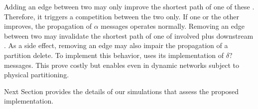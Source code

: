 Adding an edge between two \processes may only improve the shortest
path of one of these \processes. Therefore, it triggers a competition
between the two \processes only. If one or the other \process
improves, the propagation of $\alpha$ messages operates normally.
Removing an edge between two \processes may invalidate the
shortest path of one of involved \processes plus downstream
\processes. As a side effect, removing an edge may also impair the
propagation of a partition delete. To implement this behavior, \NAME
uses its implementation of $\delta?$ messages. This prove costly but
enables \NAME even in dynamic networks subject to physical
partitioning.

Next Section provides the details of our simulations that assess the
proposed implementation.

